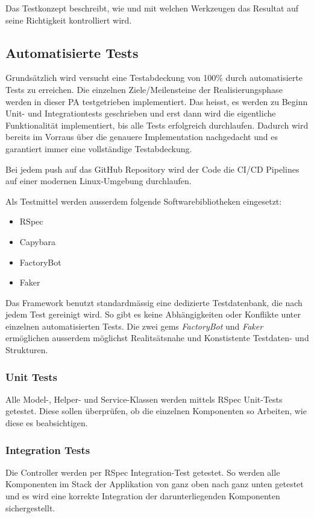 Das Testkonzept beschreibt, wie und mit welchen Werkzeugen das Resultat auf seine Richtigkeit kontrolliert wird.

\subsection{Automatisierte Tests}

Grundsätzlich wird versucht eine Testabdeckung von 100\% durch automatisierte Tests zu erreichen. Die einzelnen
Ziele/Meilensteine der Realisierungsphase werden in dieser PA testgetrieben implementiert. Das heisst, es werden zu Beginn
Unit- und Integrationtests geschrieben und erst dann wird die eigentliche Funktionalität implementiert, bis alle Tests erfolgreich durchlaufen. Dadurch wird
bereits im Vorraus über die genauere Implementation nachgedacht und es garantiert immer eine vollständige Testabdeckung.

Bei jedem push auf das GitHub Repository wird der Code die CI/CD Pipelines auf einer modernen Linux-Umgebung durchlaufen.

Als Testmittel werden ausserdem folgende Softwarebibliotheken eingesetzt:
\begin{itemize}
    \item RSpec
    \item Capybara
    \item FactoryBot
    \item Faker
\end{itemize}

Das Framework benutzt standardmässig eine dedizierte Testdatenbank, die nach jedem Test gereinigt wird. So gibt es keine Abhängigkeiten
oder Konflikte unter einzelnen automatisierten Tests. Die zwei gems \emph{FactoryBot} und \emph{Faker} ermöglichen ausserdem möglichst
Realitsätsnahe und Konstistente Testdaten- und Strukturen.

\subsubsection{Unit Tests}
Alle Model-, Helper- und Service-Klassen werden mittels RSpec Unit-Tests getestet. Diese sollen überprüfen,
ob die einzelnen Komponenten so Arbeiten, wie diese es beabsichtigen.

\subsubsection{Integration Tests}
Die Controller werden per RSpec Integration-Test getestet. So werden alle Komponenten im Stack der Applikation von ganz oben
nach ganz unten getestet und es wird eine korrekte Integration der darunterliegenden Komponenten sichergestellt.

